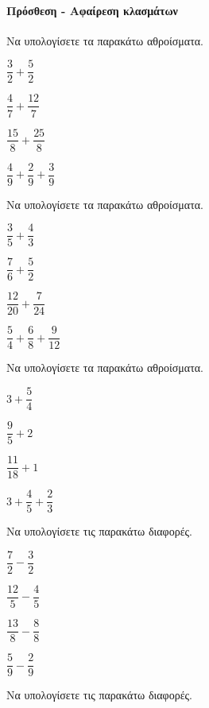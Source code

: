 \documentclass[11pt,a4paper,modern]{FFExercises}
\begin{document}
\paragraph{Πρόσθεση - Αφαίρεση κλασμάτων}
\askhsh
Να υπολογίσετε τα παρακάτω αθροίσματα.
\begin{multicols}{2}
\begin{alist}
\item $ \dfrac{3}{2}+\dfrac{5}{2} $
\item $ \dfrac{4}{7}+\dfrac{12}{7} $
\item $ \dfrac{15}{8}+\dfrac{25}{8} $
\item $ \dfrac{4}{9}+\dfrac{2}{9}+\dfrac{3}{9} $
\end{alist}
\end{multicols}
\askhsh
Να υπολογίσετε τα παρακάτω αθροίσματα.
\begin{multicols}{2}
\begin{alist}
\item $ \dfrac{3}{5}+\dfrac{4}{3} $
\item $ \dfrac{7}{6}+\dfrac{5}{2} $
\item $ \dfrac{12}{20}+\dfrac{7}{24} $
\item $ \dfrac{5}{4}+\dfrac{6}{8}+\dfrac{9}{12} $
\end{alist}
\end{multicols}
\askhsh
Να υπολογίσετε τα παρακάτω αθροίσματα.
\begin{multicols}{2}
\begin{alist}
\item $ 3+\dfrac{5}{4} $
\item $ \dfrac{9}{5}+2 $
\item $ \dfrac{11}{18}+1 $
\item $ 3+\dfrac{4}{5}+\dfrac{2}{3} $
\end{alist}
\end{multicols}
\askhsh
Να υπολογίσετε τις παρακάτω διαφορές.
\begin{multicols}{2}
\begin{alist}
\item $ \dfrac{7}{2}-\dfrac{3}{2} $
\item $ \dfrac{12}{5}-\dfrac{4}{5} $
\item $ \dfrac{13}{8}-\dfrac{8}{8} $
\item $ \dfrac{5}{9}-\dfrac{2}{9} $
\end{alist}
\end{multicols}
\askhsh
Να υπολογίσετε τις παρακάτω διαφορές.
\end{document}
